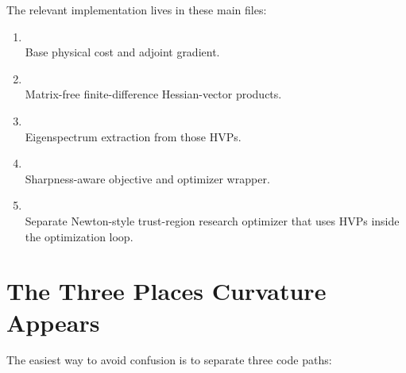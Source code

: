 \documentclass[11pt,letterpaper]{article}
\begin{document}
The relevant implementation lives in these main files:
\begin{enumerate}[leftmargin=*]
  \item {\footnotesize{}}\\
  Base physical cost and adjoint gradient.
  \item {\footnotesize{}}\\
  Matrix-free finite-difference Hessian-vector products.
  \item {\footnotesize{}}\\
  Eigenspectrum extraction from those HVPs.
  \item {\footnotesize{}}\\
  Sharpness-aware objective and optimizer wrapper.
  \item {\footnotesize{}}\\
  Separate Newton-style trust-region research optimizer that uses HVPs inside
  the optimization loop.
\end{enumerate}

\section{The Three Places Curvature Appears}

The easiest way to avoid confusion is to separate three code paths:
\end{document}
